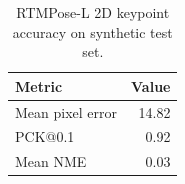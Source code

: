 \begin{table}[t]
\centering
\caption{RTMPose-L 2D keypoint accuracy on synthetic test set.}
\begin{tabular}{lr}
\toprule
Metric & Value \\
\midrule
Mean pixel error & 14.82 \\
PCK@0.1 & 0.92 \\
Mean NME & 0.03 \\
\bottomrule
\end{tabular}
\end{table}